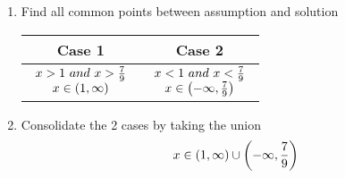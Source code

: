 \begin{enumerate}
	\item
	      Find all common points between assumption and solution \\
	      \begin{table}[H]
		      \centering
		      \begin{tabular}{|c|c|} \hline
			      \textbf{Case 1} & \textbf{Case 2}                \\ \hline
			      $ \begin{array}{ccc} x > 1 \ and \ x > {7 \over 9} \\ x \in (1, \infty) \end{array} $
			                      & $ \begin{array}{ccc} x < 1 \ and \ x < {7 \over 9} \\ x \in \left(-\infty, {7 \over 9}\right) \end{array} $ \\ \hline
		      \end{tabular}
	      \end{table}

	\item
	      Consolidate the 2 cases by taking the union \\
	      $$
		      x \in (1, \infty) \cup \left(-\infty, {7 \over 9}\right)
	      $$
\end{enumerate}

